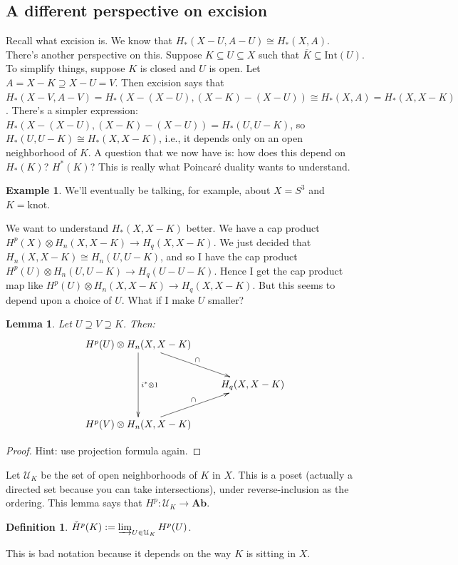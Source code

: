 \documentclass{amsart}
\theoremstyle{theorem}
\newtheorem{lemma}[theorem]{Lemma}
\theoremstyle{definition}
\newtheorem{definition}[theorem]{Definition}
\newtheorem{example}[theorem]{Example}
\newcommand\cHH{\check{H}}
\begin{document}
\subsection{A different perspective on excision}
Recall what excision is. We know that $ H_\ast(X-U,A-U)\cong H_\ast(X,A)$. There's another perspective on this. Suppose $K\subseteq U\subseteq X$ such that $\overline{K}\subseteq\mathrm{Int}(U)$. To simplify things, suppose $K$ is closed and $U$ is open. Let $A=X-K\supseteq X-U=V$. Then excision says that $ H_\ast(X-V,A-V)= H_\ast(X-(X-U),(X-K)-(X-U))\cong H_\ast(X,A)= H_\ast(X,X-K)$. There's a simpler expression: $ H_\ast(X-(X-U),(X-K)-(X-U))= H_\ast(U,U-K)$, so $ H_\ast(U,U-K)\cong H_\ast(X,X-K)$, i.e., it depends only on an open neighborhood of $K$. A question that we now have is: how does this depend on $ H_\ast(K)$? $ H^\ast(K)$? This is really what Poincar\'{e} duality wants to understand.
\begin{example}
We'll eventually be talking, for example, about $X=S^3$ and $K=\text{knot}$.
\end{example}
We want to understand $ H_\ast(X,X-K)$ better. We have a cap product $ H^p(X)\otimes H_n(X,X-K)\to H_q(X,X-K)$. We just decided that $ H_n(X,X-K)\cong H_n(U,U-K)$, and so I have the cap product $ H^p(U)\otimes H_n(U,U-K)\to H_q(U-U-K)$. Hence I get the cap product map like $ H^p(U)\otimes H_n(X,X-K)\to H_q(X,X-K)$. But this seems to depend upon a choice of $U$. What if I make $U$ smaller?
\begin{lemma}
Let $U\supseteq V\supseteq K$. Then:
\begin{equation*}
\xymatrix{
	 H^p(U)\ar[dd]^{i^\ast\otimes 1}\otimes H_n(X,X-K)\ar[dr]^\cap & \\
	 & H_q(X,X-K)\\
	 H^p(V)\otimes H_n(X,X-K)\ar[ur]^\cap
}
\end{equation*}
\end{lemma}
\begin{proof}
Hint: use projection formula again.
\end{proof}
Let $\mathcal{U}_K$ be the set of open neighborhoods of $K$ in $X$. This is a poset (actually a directed set because you can take intersections), under reverse-inclusion as the ordering. This lemma says that $ H^p:\mathcal{U}_K\to\mathbf{Ab}$.
\begin{definition}
$\cHH^p(K):=\varinjlim_{U\in\mathcal{U}_K} H^p(U)$.
\end{definition}
This is bad notation because it depends on the way $K$ is sitting in $X$.
\end{document}
